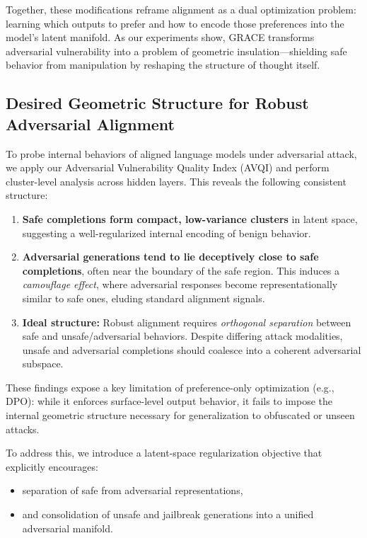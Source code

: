 Together, these modifications reframe alignment as a dual optimization problem: learning which outputs to prefer and how to encode those preferences into the model’s latent manifold. As our experiments show, \textsc{GRACE} transforms adversarial vulnerability into a problem of geometric insulation—shielding safe behavior from manipulation by reshaping the structure of thought itself.





\subsection{Desired Geometric Structure for Robust Adversarial Alignment}

To probe internal behaviors of aligned language models under adversarial attack, we apply our Adversarial Vulnerability Quality Index (AVQI) and perform cluster-level analysis across hidden layers. This reveals the following consistent structure:

\begin{enumerate}
    \item \textbf{Safe completions form compact, low-variance clusters} in latent space, suggesting a well-regularized internal encoding of benign behavior.

    \item \textbf{Adversarial generations tend to lie deceptively close to safe completions}, often near the boundary of the safe region. This induces a \emph{camouflage effect}, where adversarial responses become representationally similar to safe ones, eluding standard alignment signals.

    \item \textbf{Ideal structure:} Robust alignment requires \emph{orthogonal separation} between safe and unsafe/adversarial behaviors. Despite differing attack modalities, unsafe and adversarial completions should coalesce into a coherent adversarial subspace.
\end{enumerate}

These findings expose a key limitation of preference-only optimization (e.g., DPO): while it enforces surface-level output behavior, it fails to impose the internal geometric structure necessary for generalization to obfuscated or unseen attacks.

To address this, we introduce a latent-space regularization objective that explicitly encourages:
\begin{itemize}[nosep,leftmargin=1em]
    \item separation of safe from adversarial representations,
    \item and consolidation of unsafe and jailbreak generations into a unified adversarial manifold.
\end{itemize}

